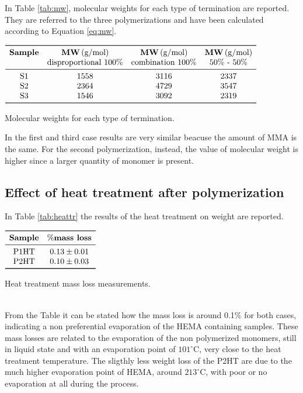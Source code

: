 \documentclass[a4paper, 11pt]{article}
\begin{document}
In Table \ref{tab:mw}, molecular weights for each type of termination are reported. They are referred to the three polymerizations and have been calculated according to Equation \ref{eq:mw}.

\begin{table}[htp]
\centering
$
\begin{array}{cccc}
\toprule
\textbf{Sample} & \textbf{MW}\,(\text{g/mol}) & \textbf{MW}\,(\text{g/mol}) & \textbf{MW}\,(\text{g/mol}) \\
& \text{disproportional 100\%} & \text{combination 100\%} & \text{50\% - 50\%} \\
\midrule
\text{S1} & 1558 & 3116 & 2337 \\
\text{S2} & 2364 & 4729 & 3547 \\
\text{S3} & 1546 & 3092 & 2319 \\
\bottomrule
\end{array}
$
\caption{Molecular weights for each type of termination.}
\label{tab:mw}
\end{table}

In the first and third case results are very similar beacuse the amount of MMA is the same. For the second polymerization, instead, the value of molecular weight is higher since a larger quantity of monomer is present.

\subsection{Effect of heat treatment after polymerization}

In Table \ref{tab:heattr} the results of the heat treatment on weight are reported.
\begin{table}[htp]
\centering
$
\begin{array}{cc}
\toprule
\textbf{Sample} & \textbf{$\%$mass loss}  \\
\midrule
\text{P1HT} & 0.13\pm0.01 \\
\text{P2HT} & 0.10\pm0.03 \\
\bottomrule
\end{array}
$
\caption{Heat treatment mass loss measurements.}
\label{tab:heattr}
\end{table}\\
From the Table it can be stated how the mass loss is around 0.1\% for both cases, indicating a non preferential evaporation of the HEMA containing samples. These mass losses are related to the evaporation of the non polymerized monomers, still in liquid state and with an evaporation point of $101^\circ$C, very close to the heat treatment temperature. The sligthly less weight loss of the P2HT are due to the much higher evaporation point of HEMA, around $213^\circ$C, with poor or no evaporation at all during the process. 
\newpage
\end{document}
